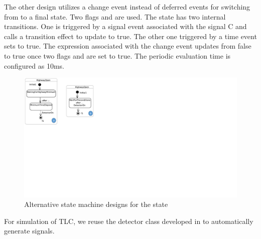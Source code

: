 The other design utilizes a change event instead of deferred events for switching from  to a final state. 
Two flags  and  are used.
The  state has two internal transitions.
One is triggered by a signal event associated with the signal C and calls a transition effect to update  to true.
The other one triggered by a time event sets  to true. 
The expression associated with the change event updates from false to true once two flags  and  are set to true. 
The periodic evaluation time is configured as 10ms.
\begin{figure}
	\centering
	\includegraphics[clip, trim=0.0cm 11.5cm 22.1cm 0cm, width=0.7\columnwidth]{figures/highwayopenalternativesoptimized}
	\caption{Alternative state machine designs for the  state} 
	\label{fig:highwayopenalternatives}
\end{figure}


For simulation of TLC, we reuse the detector class developed in \cite{trafficlight} to automatically generate  signals. 

